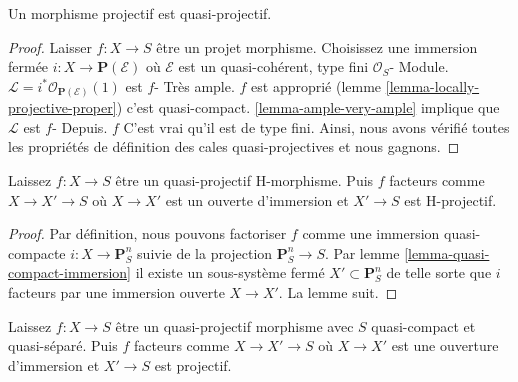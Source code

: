\begin{lemma}

\label{lemma-projective-quasi-projective}

Un morphisme projectif est quasi-projectif.

\end{lemma}

\begin{proof}

Laisser $f : X \to S$ être un projet morphisme. Choisissez une immersion fermée
$i : X \to \mathbf{P}(\mathcal{E})$ où $\mathcal{E}$ est un quasi-cohérent, type fini $\mathcal{O}_S$- Module.
$\mathcal{L} = i^*\mathcal{O}_{\mathbf{P}(\mathcal{E})}(1)$ est $f$- Très ample. $f$ est approprié (lemme \ref{lemma-locally-projective-proper}) c'est quasi-compact. \ref{lemma-ample-very-ample} implique que $\mathcal{L}$ est $f$- Depuis. $f$ C'est vrai qu'il est de type fini. Ainsi, nous avons vérifié toutes les propriétés de définition des cales quasi-projectives et nous gagnons.

\end{proof}

\begin{lemma}

\label{lemma-H-quasi-projective-open-H-projective}
Laissez $f : X \to S$ être un quasi-projectif H-morphisme. Puis $f$ facteurs comme $X \to X' \to S$ où $X \to X'$ est un ouverte d'immersion et $X' \to S$ est H-projectif.
\end{lemma}

\begin{proof}
Par définition, nous pouvons factoriser $f$ comme une immersion quasi-compacte $i : X \to \mathbf{P}^n_S$ suivie de la projection $\mathbf{P}^n_S \to S$. Par lemme \ref{lemma-quasi-compact-immersion} il existe un sous-système fermé $X' \subset \mathbf{P}^n_S$ de telle sorte que $i$ facteurs par une immersion ouverte $X \to X'$. La lemme suit.
\end{proof}

\begin{lemma}

\label{lemma-quasi-projective-open-projective}
Laissez $f : X \to S$ être un quasi-projectif morphisme avec $S$ quasi-compact et quasi-séparé. Puis $f$ facteurs comme $X \to X' \to S$ où $X \to X'$ est une ouverture d'immersion et $X' \to S$ est projectif.
\end{lemma}

